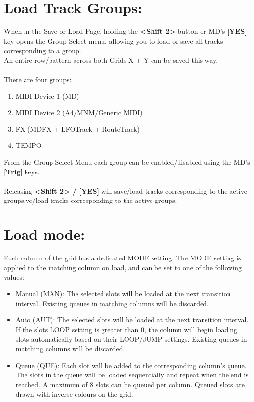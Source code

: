 \section{Load Track Groups:}
When in the Save or Load Page, holding the \textbf{<Shift 2>} button or MD's \textbf{[YES]} key opens the Group Select menu,
allowing you to load or save all tracks corresponding to a group.\\An entire row/pattern across both Grids X + Y can be saved this way.\\
\\
There are four groups:
\begin{enumerate}
    \item MIDI Device 1 (MD)
    \item MIDI Device 2 (A4/MNM/Generic MIDI)
    \item FX (MDFX + LFOTrack + RouteTrack)
    \item TEMPO
\end{enumerate}
From the Group Select Menu each group can be enabled/disabled using the MD's \textbf{[Trig]} keys.\\
\\
Releasing \textbf{<Shift 2> / [YES]} will save/load tracks corresponding to the active groups.ve/load tracks corresponding to the active groups.
\newpage
\section{Load mode:}
Each column of the grid has a dedicated MODE setting. The MODE setting is applied to the matching column on load, and can be set to one of the following values:

\begin{itemize}
    \item Manual (MAN):  The selected slots will be loaded at the next transition interval. Existing queues in matching columns will be discarded.
    \item Auto (AUT): The selected slots will be loaded at the next transition interval. If the slots LOOP setting is greater than 0, the column will begin loading slots automatically based on their LOOP/JUMP settings. Existing queues in matching columns will be discarded.
    \item Queue (QUE): Each slot will be added to the corresponding column's queue. The slots in the queue will be loaded sequentially and repeat when the end is reached. A maximum of 8 slots can be queued per column. Queued slots are drawn with inverse colours on the grid.
\end{itemize}

